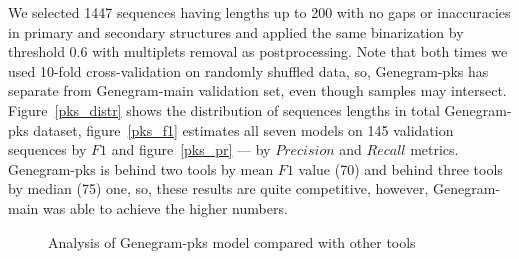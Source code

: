 We selected 1447 sequences having lengths up to 200 with no gaps or inaccuracies in primary and secondary structures and applied the same binarization by threshold 0.6 with multiplets removal as postprocessing. Note that both times we used 10-fold cross-validation on randomly shuffled data, so, Genegram-pks has separate from Genegram-main validation set, even though samples may intersect. Figure~\ref{pks_distr} shows the distribution of sequences lengths in total Genegram-pks dataset, figure~\ref{pks_f1} estimates all seven models on 145 validation sequences by $F1$ and figure~\ref{pks_pr} --- by $Precision$ and $Recall$ metrics. Genegram-pks is behind two tools by mean $F1$ value (70) and behind three tools by median (75) one, so, these results are quite competitive, however, Genegram-main was able to achieve the higher numbers.

\begin{figure}
\centering
    \hfill
    \par 
\caption{Analysis of Genegram-pks model compared with other tools }
\label{plots_pks}
\end{figure}

